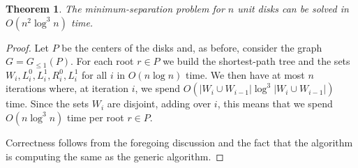 \documentclass[a4paper,11pt]{article}
\newtheorem{theorem}{Theorem}
\newcommand{\GG}{\ensuremath{G_{\le 1}}}
\def\dist{\mathit{dist}}
\def\best{\mathit{best}}
\let\le\leqslant
\newcommand{\out}[1]{}
\begin{document}
\begin{theorem}
	The minimum-separation problem for $n$ unit disks 
	can be solved in $O(n^2 \log^3 n)$ time.
\end{theorem}
\begin{proof}
	Let $P$ be the centers of the disks and,
	as before, consider the graph $G=\GG(P)$.
	For each root $r\in P$ we build the shortest-path tree
	and the sets $W_i,L_i^0,L_i^1,R_i^0,L_i^1$ for all $i$ in $O(n\log n)$ time.
	We then have at most $n$ iterations where, at iteration $i$,
	we spend $O(|W_i\cup W_{i-1}|\log^3 |W_i\cup W_{i-1}|)$ time.
	Since the sets $W_i$ are disjoint,
	adding over $i$, this means that we spend $O(n\log^3 n)$ time per root $r\in P$.
	
	Correctness follows from the foregoing discussion and the fact 
	that the algorithm is computing the same as the generic algorithm.
\end{proof}

\out{%
\begin{figure}[htb]
\begin{center}
\ovalbox{~~~~
\begin{varwidth}{\linewidth}
\begin{codebox}
    \Procname{~~\Comment Work for root $r\in P$}
   	\li $(\dist[~],\pi[~])\gets$ shortest path tree from $r$ in $\GG(P)$
	\li Compute the levels $W_0,W_1,\dots$
	\li \For $i=0\dots n$ \Do
		\li Compute $N[p]$ for each $p$ in $W_i$
		\li Compute $L^0_i$, $L^1_i$, $R^0_i$, $R^1_i$
		\End
    \li $i=1$
    \li \While $2i< \best$ and $W_i\neq\emptyset$ \Do
		\\ \> \Comment within each side of the $y$-axis 
		\li search candidates in \\
			\> ~~~$L^0_i\times L^1_{i-1}$, $L^1_i\times L^0_{i-1}$, 
				$R^0_i\times R^1_{i-1}$, $R^1_i\times R^0_{i-1}$,
				$L^0_i\times L^1_{i}$ and $R^0_i\times R^1_{i}$
		\\ \> \Comment across $y$-axis crosing $\sigma$
		\li search candidates crossing $\sigma$ in \\
			\> ~~~ $L^0_i\times R^0_{i-1}$, 
				$L^1_i\times R^1_{i-1}$, $L^0_{i-1}\times R^0_{i}$, 
				$L^1_{i-1}\times R^1_{i}$, $L^0_i\times R^0_{i}$ 
				and $L^1_i\times R^1_{i}$
		\\ \> \Comment across $y$-axis not crosing $\sigma$			
		\li search candidates not crossing $\sigma$ in \\
			\> ~~~ $L^0_i\times R^1_{i-1}$, 
				$L^1_i\times R^0_{i-1}$, $L^1_{i-1}\times R^0_{i}$, 
				$L^0_{i-1}\times R^1_{i}$, $L^0_i\times R^1_{i}$ 
				and $L^1_i\times R^0_{i}$		
		\li $i \gets i+1$
		\End
    \\[-2mm]
\end{codebox}
\end{varwidth}
~~~~}\end{center}
\caption{Work for each vertex in the new algorithm for minimum separation with unit disks.}
\label{fig:compact}
\end{figure}
}
\end{document}
